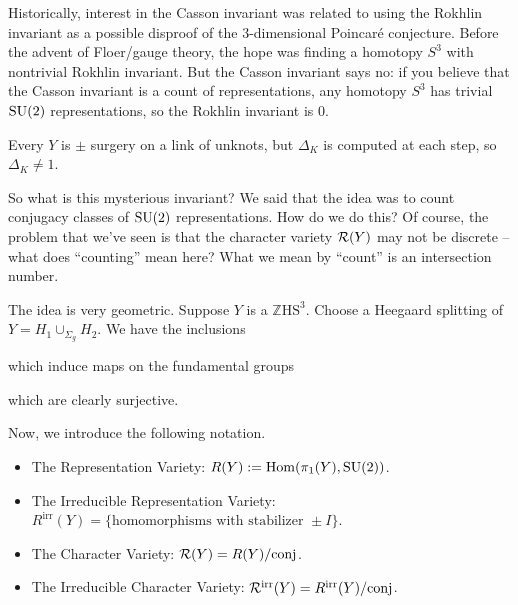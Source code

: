 \documentclass[main]{subfiles}
\begin{document}
Historically, interest in the Casson invariant was related to using the Rokhlin invariant as a possible disproof of the $3$-dimensional Poincar\'e conjecture. Before the advent of Floer/gauge theory, the hope was finding a homotopy $S^3$ with nontrivial Rokhlin invariant. But the Casson invariant says no: if you believe that the Casson invariant is a count of representations, any homotopy $S^3$ has trivial $\operatorname{SU}(2)$ representations, so the Rokhlin invariant is $0$.

\begin{remark}
Every $Y$ is $\pm$ surgery on a link of unknots, but $\Delta_K$ is computed at each step, so $\Delta_K\neq 1$.
\end{remark}

So what is this mysterious invariant? We said that the idea was to count conjugacy classes of $\operatorname{SU}(2)$ representations. How do we do this? Of course, the problem that we've seen is that the character variety $\mathcal{R}(Y)$ may not be discrete -- what does ``counting'' mean here? What we mean by ``count'' is an intersection number.

The idea is very geometric. Suppose $Y$ is a $\mathbb{Z}\mathrm{HS}^3$. Choose a Heegaard splitting of $Y = H_1\cup_{\Sigma_g}H_2$. We have the inclusions
\begin{center}
\end{center}
which induce maps on the fundamental groups
\begin{center}
\end{center}
which are clearly surjective.

Now, we introduce the following notation.

\begin{definition}
\begin{itemize}
\item The Representation Variety: $R(Y) := \mathrm{Hom}(\pi_1(Y),\operatorname{SU}(2))$.
\item The Irreducible Representation Variety: $R^{\mathrm{irr}}(Y) = \{\text{homomorphisms with stabilizer } \pm I\}$.
\item The Character Variety: $\mathcal{R}(Y) = R(Y)/\mathrm{conj}$.
\item The Irreducible Character Variety: $\mathcal{R}^{\mathrm{irr}}(Y) = R^{\mathrm{irr}}(Y)/\mathrm{conj}$.
\end{itemize}
\end{definition}
\end{document}
